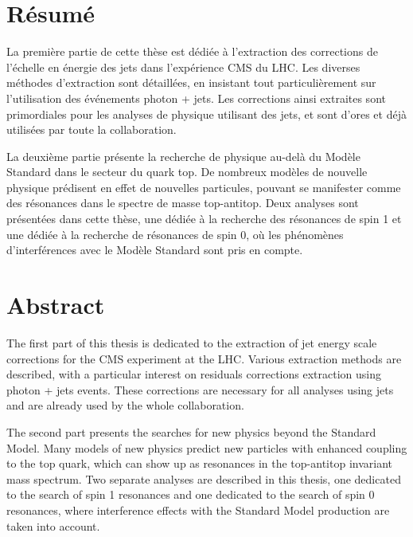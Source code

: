 \begingroup
\let\clearpage\relax
\let\cleardoublepage\relax
\let\cleardoublepage\relax

\chapter*{Résumé}

La première partie de cette thèse est dédiée à l'extraction des corrections de l'échelle en énergie des jets dans l'expérience CMS du LHC. Les diverses méthodes d'extraction sont détaillées, en insistant tout particulièrement sur l'utilisation des événements photon + jets. Les corrections ainsi extraites sont primordiales pour les analyses de physique utilisant des jets, et sont d'ores et déjà utilisées par toute la collaboration.

La deuxième partie présente la recherche de physique au-delà du Modèle Standard dans le secteur du quark top. De nombreux modèles de nouvelle physique prédisent en effet de nouvelles particules, pouvant se manifester comme des résonances dans le spectre de masse top-antitop. Deux analyses sont présentées dans cette thèse, une dédiée à la recherche des résonances de spin 1 et une dédiée à la recherche de résonances de spin 0, où les phénomènes d'interférences avec le Modèle Standard sont pris en compte.

\vfill

\chapter*{Abstract}

The first part of this thesis is dedicated to the extraction of jet energy scale corrections for the CMS experiment at the LHC. Various extraction methods are described, with a particular interest on residuals corrections extraction using photon + jets events. These corrections are necessary for all analyses using jets and are already used by the whole collaboration.

The second part presents the searches for new physics beyond the Standard Model. Many models of new physics predict new particles with enhanced coupling to the top quark, which can show up as resonances in the top-antitop invariant mass spectrum. Two separate analyses are described in this thesis, one dedicated to the search of spin 1 resonances and one dedicated to the search of spin 0 resonances, where interference effects with the Standard Model production are taken into account.

\endgroup

\vfill